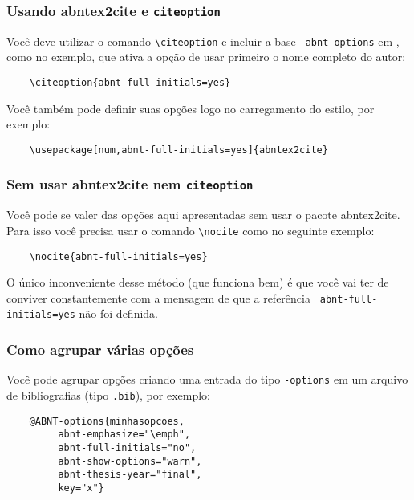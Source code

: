 \documentclass[a4paper]{ltxdoc}
\begin{document}
\subsubsection{Usando \textsf{abntex2cite} e {\tt citeoption}}

\DescribeMacro{\citeoption}
Você deve utilizar o comando \verb+\citeoption+ e incluir a base {\tt
abnt-options} em \verb++, como no exemplo, que ativa a opção de
usar primeiro o nome completo do autor:

\begin{verbatim}
    \citeoption{abnt-full-initials=yes}
\end{verbatim}

Você também pode definir suas opções logo no carregamento do estilo, por
exemplo:

\begin{verbatim}
    \usepackage[num,abnt-full-initials=yes]{abntex2cite}
\end{verbatim}

\subsubsection{Sem usar \textsf{abntex2cite} nem {\tt citeoption}}

\DescribeMacro{\nocite}
Você pode se valer das opções aqui apresentadas sem usar o pacote
\textsf{abntex2cite}. Para isso você precisa usar o comando \verb+\nocite+ como
no seguinte exemplo:

\begin{verbatim}
    \nocite{abnt-full-initials=yes}
\end{verbatim}

O único inconveniente desse método (que funciona bem) é que você vai ter de
conviver constantemente com a mensagem de que a referência {\tt
abnt-full-initials=yes} não foi definida.

\subsubsection{Como agrupar várias opções}

\DescribeMacro{\citeoption}
Você pode agrupar opções criando uma entrada do tipo {\tt \@ABNT-options}
em um arquivo de bibliografias (tipo {\tt .bib}), por exemplo:

\begin{verbatim}
    @ABNT-options{minhasopcoes,
         abnt-emphasize="\emph",
         abnt-full-initials="no",
         abnt-show-options="warn",
         abnt-thesis-year="final",
         key="x"}
\end{verbatim}
\end{document}
